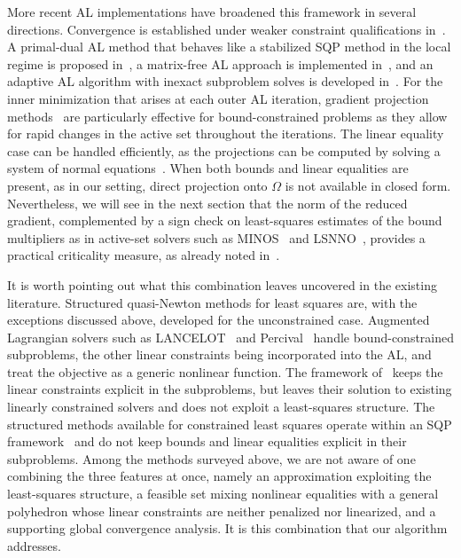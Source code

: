 \documentclass[pdflatex,sn-mathphys-num]{sn-jnl}%
\theoremstyle{thmstyleone}%
\begin{document}
More recent AL implementations have broadened this framework in several directions. Convergence is established under weaker constraint qualifications in~\cite{andreani-etal:2008}. A primal-dual AL method that behaves like a stabilized SQP method in the local regime is proposed in~\cite{gillrobinson:2012}, a matrix-free AL approach is implemented in~\cite{arreckx-etal:2016}, and an adaptive AL algorithm with inexact subproblem solves is developed in~\cite{curtis-etal:2015}.
For the inner minimization that arises at each outer AL iteration, gradient projection methods~\cite{moretoraldo:1991, linmore:1999a} are particularly effective for bound-constrained problems as they allow for rapid changes in the active set throughout the iterations. The linear equality case can be handled efficiently, as the projections can be computed by solving a system of normal equations~\cite{gould-etal:2001}.
When both bounds and linear equalities are present, as in our setting, direct projection onto $\Omega$ is not available in closed form. Nevertheless, we will see in the next section that the norm of the reduced gradient, complemented by a sign check on least-squares estimates of the bound multipliers as in active-set solvers such as MINOS~\cite{murtaghsaunders:1978} and LSNNO~\cite{tointtuyttens:1992}, provides a practical criticality measure, as already noted in~\cite[Section~7.2]{conn-etal:1996b}.

It is worth pointing out what this combination leaves uncovered in the existing literature. Structured quasi-Newton methods for least squares are, with the exceptions discussed above, developed for the unconstrained case. Augmented Lagrangian solvers such as LANCELOT~\cite{conn-etal:1992} and Percival~\cite{arreckx-etal:2016} handle bound-constrained subproblems, the other linear constraints being incorporated into the AL, and treat the objective as a generic nonlinear function. The framework of~\cite{conn-etal:1996b} keeps the linear constraints explicit in the subproblems, but leaves their solution to existing linearly constrained solvers and does not exploit a least-squares structure. The structured methods available for constrained least squares operate within an SQP framework~\cite{amiribartels:1989, tjoabiegler:1991, li-etal:2002} and do not keep bounds and linear equalities explicit in their subproblems. Among the methods surveyed above, we are not aware of one combining the three features at once, namely an approximation exploiting the least-squares structure, a feasible set mixing nonlinear equalities with a general polyhedron whose linear constraints are neither penalized nor linearized, and a supporting global convergence analysis. It is this combination that our algorithm addresses.
\end{document}
